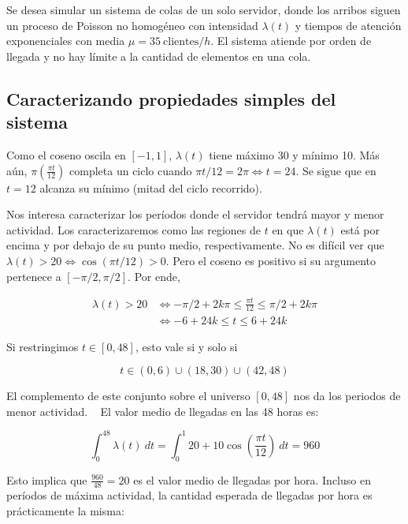 \documentclass[a4paper, 12pt]{article}
\begin{document}
Se desea simular un sistema de colas de un solo servidor, donde los arribos
siguen un proceso de Poisson no homogéneo con intensidad $\lambda(t)$ y tiempos
de atención exponenciales con media $\mu = 35 ~ \text{clientes}/h$. El sistema
atiende por orden de llegada y no hay límite a la cantidad de elementos en una
cola.

\subsection{Caracterizando propiedades simples del sistema}

Como el coseno oscila en $[-1, 1]$, $\lambda(t)$ tiene máximo 30 y mínimo 10. Más
aún, $\pi\left( \frac{\pi t}{12} \right) $ completa un ciclo cuando $\pi t / 12
= 2 \pi \iff t = 24$. Se sigue que en $t = 12$ alcanza su mínimo (mitad del
ciclo recorrido). 

Nos interesa caracterizar los períodos donde el servidor tendrá mayor y menor
actividad. Los caracterizaremos como las regiones de $t$ en que $\lambda(t)$
está por encima y por debajo de su punto medio, respectivamente.
No es difícil ver que $\lambda(t) > 20 \iff \cos(\pi t / 12) > 0$. Pero el
coseno es positivo si su argumento pertenece a $[- \pi / 2, \pi / 2]$. Por ende, 

\begin{align}
    \lambda(t) > 20 &\iff -\pi / 2 + 2k\pi \leq \frac{\pi t}{12}  \leq \pi / 2 +
    2k \pi\\ 
                    &\iff-6 + 24k \leq t \leq 6 + 24k
\end{align}

Si restringimos $t \in [0, 48]$, esto vale si y solo si 

\begin{equation}
    t \in (0, 6) \cup  (18, 30) \cup  (42, 48)
\end{equation}

El complemento de este conjunto sobre el universo $[0, 48]$ nos da los periodos
de menor actividad.
~
El valor medio de llegadas en las 48 horas es:

\begin{equation}
\int_0^{48} \lambda(t) ~ dt = \int_0^1 
20 + 10 \cos(\frac{\pi
    t}{12})
    ~ dt = 960
\end{equation}

Esto implica que $\frac{960}{48} = 20$ es el valor medio de llegadas por hora.
Incluso en períodos de máxima actividad, la cantidad esperada de llegadas por
hora es prácticamente la misma:
\end{document}
